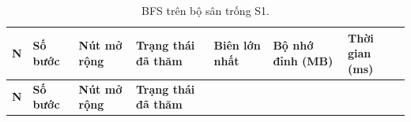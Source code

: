 \begin{longtable}[]{@{}
  >{\raggedright\arraybackslash}p{}
  >{\raggedright\arraybackslash}p{}
  >{\raggedright\arraybackslash}p{}
  >{\raggedright\arraybackslash}p{}
  >{\raggedright\arraybackslash}p{}
  >{\raggedright\arraybackslash}p{}
  >{\raggedright\arraybackslash}p{}@{}}
\caption{ BFS trên bộ sân trống S1.}\tabularnewline
\toprule\noalign{}
\rowcolor{tablehead}\begin{minipage}[b]{\linewidth}\raggedright
\textbf{N}
\end{minipage} & \begin{minipage}[b]{\linewidth}\raggedright
\textbf{Số bước}
\end{minipage} & \begin{minipage}[b]{\linewidth}\raggedright
\textbf{Nút mở rộng}
\end{minipage} & \begin{minipage}[b]{\linewidth}\raggedright
\textbf{Trạng thái đã thăm}
\end{minipage} & \begin{minipage}[b]{\linewidth}\raggedright
\textbf{Biên lớn nhất}
\end{minipage} & \begin{minipage}[b]{\linewidth}\raggedright
\textbf{Bộ nhớ đỉnh (MB)}
\end{minipage} & \begin{minipage}[b]{\linewidth}\raggedright
\textbf{Thời gian (ms)}
\end{minipage} \\
\midrule\noalign{}
\endfirsthead
\toprule\noalign{}
\rowcolor{tablehead}\begin{minipage}[b]{\linewidth}\raggedright
\textbf{N}
\end{minipage} & \begin{minipage}[b]{\linewidth}\raggedright
\textbf{Số bước}
\end{minipage} & \begin{minipage}[b]{\linewidth}\raggedright
\textbf{Nút mở rộng}
\end{minipage} & \begin{minipage}[b]{\linewidth}\raggedright
\textbf{Trạng thái đã thăm}

\end{minipage}
\end{longtable}
